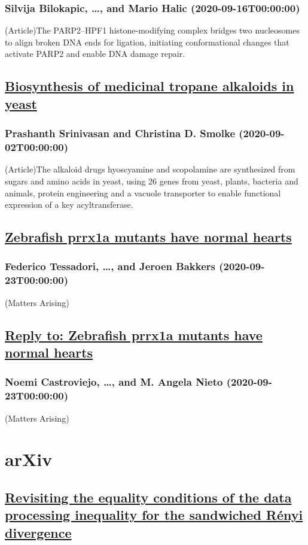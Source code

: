 \subsubsection*{Silvija Bilokapic, \dots, and Mario Halic (2020-09-16T00:00:00)}
(Article)The PARP2–HPF1 histone-modifying complex bridges two nucleosomes to align broken DNA ends for ligation, initiating conformational changes that activate PARP2 and enable DNA damage repair.
\subsection*{\href{https://www.nature.com/articles/s41586-020-2650-9}{Biosynthesis of medicinal tropane alkaloids in yeast}}
\subsubsection*{Prashanth Srinivasan and Christina D. Smolke (2020-09-02T00:00:00)}
(Article)The alkaloid drugs hyoscyamine and scopolamine are synthesized from sugars and amino acids in yeast, using 26 genes from yeast, plants, bacteria and animals, protein engineering and a vacuole transporter to enable functional expression of a key acyltransferase.
\subsection*{\href{https://www.nature.com/articles/s41586-020-2674-1}{Zebrafish prrx1a mutants have normal hearts}}
\subsubsection*{Federico Tessadori, \dots, and Jeroen Bakkers (2020-09-23T00:00:00)}
(Matters Arising)
\subsection*{\href{https://www.nature.com/articles/s41586-020-2675-0}{Reply to: Zebrafish prrx1a mutants have normal hearts}}
\subsubsection*{Noemi Castroviejo, \dots, and M. Angela Nieto (2020-09-23T00:00:00)}
(Matters Arising)
\clearpage
\section{arXiv}
\subsection*{\href{http://arxiv.org/abs/2009.14197v1}{Revisiting the equality conditions of the data processing inequality for  the sandwiched Rényi divergence}}
